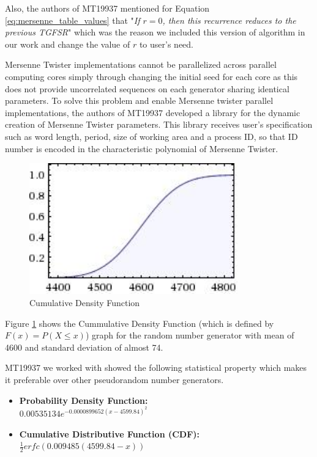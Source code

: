 \documentclass[12pt,journal,compsoc]{IEEEtran}
\begin{document}
Also, the authors of MT19937\cite{MT19937} mentioned for Equation \ref{eq:mersenne_table_values} that "\emph{If $r=0$, then this recurrence reduces to the previous TGFSR}" which was the reason we included this version of algorithm in our work and change the value of $r$ to user's need.

Mersenne Twister implementations cannot be parallelized across parallel computing cores simply through changing the initial seed for each core as this does not provide uncorrelated sequences on each generator sharing identical parameters. To solve this problem and enable Mersenne twister parallel implementations, the authors of MT19937\cite{MT19937} developed a library for the dynamic creation of Mersenne Twister parameters. This library receives user's specification such as word length, period, size of working area and a process ID, so that ID number is encoded in the characteristic polynomial of Mersenne Twister.
\begin{figure}[ht!]
\centering
\includegraphics[width=90mm]{images/cdf_mersenne.jpeg}
\caption{Cumulative Density Function}
\label{fig:cdf_mersenne}
\end{figure}


Figure \ref{fig:cdf_mersenne} shows the Cummulative Density Function (which is defined by $F(x) = P(X\leq x)$) graph for the random number generator with mean of 4600 and standard deviation of almost 74. 


MT19937 we worked with showed the following statistical property which makes it preferable over other pseudorandom number generators.\cite{wolfram_mt}
\begin{itemize}
	\item {\bf Probability Density Function: }\\
		$0.00535134e^{-0.0000899652 (x-4599.84)^{2}}$
	\item {\bf Cumulative Distributive Function (CDF): }\\
		$\frac{1}{2}erfc(0.009485(4599.84-x))$
\end{itemize}
\end{document}
